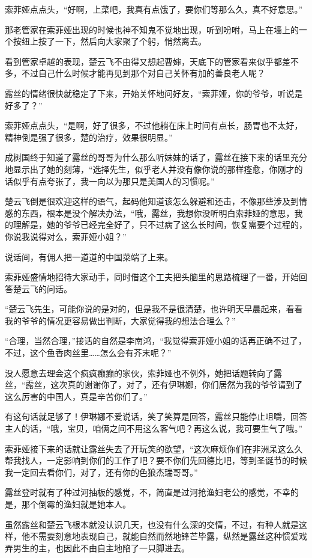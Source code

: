 索菲娅点点头，“好啊，上菜吧，我真有点饿了，要你们等那么久，真不好意思。”

那老管家在索菲娅出现的时候也神不知鬼不觉地出现，听到吩咐，马上在墙上的一个按纽上按了一下，然后向大家聚了个躬，悄然离去。

看到管家卓越的表现，楚云飞不由得又想起曹婶，天底下的管家看来似乎都差不多，不过自己什么时候才能再见到那个对自己关怀有加的善良老人呢？

露丝的情绪很快就稳定了下来，开始关怀地问好友，“索菲娅，你的爷爷，听说是好多了？”

索菲娅点点头，“是啊，好了很多，不过他躺在床上时间有点长，肠胃也不太好，精神倒是强了很多，楚的治疗，效果很明显。”

成树国终于知道了露丝的哥哥为什么那么听妹妹的话了，露丝在接下来的话里充分地显示出了她的刻薄，“选择先生，似乎老人并没有像你说的那样痊愈，你刚才的话似乎有点夸张了，我一向以为那只是美国人的习惯呢。”

楚云飞倒是很欢迎这样的语气，起码他知道该怎么躲避和还击，不像那些涉及到情感的东西，根本是没个解决办法，“哦，露丝，我想你没听明白索菲娅的意思，我的理解是，她的爷爷已经完全好了，只不过病了这么长时间，恢复需要个过程的，你说我说得对么，索菲娅小姐？”

说话间，有佣人把一道道的中国菜端了上来。

索菲娅盛情地招待大家动手，同时借这个工夫把头脑里的思路梳理了一番，开始回答楚云飞的问话。

“楚云飞先生，可能你说的是对的，但是我不是很清楚，也许明天早晨起来，看看我的爷爷的情况更容易做出判断，大家觉得我的想法合理么？”

“合理，当然合理，”接话的自然是李南鸿，“我觉得索菲娅小姐的话再正确不过了，不过，这个鱼香肉丝里……怎么会有芥末呢？”

没人愿意去理会这个疯疯癫癫的家伙，索菲娅也不例外，她把话题转向了露丝，“露丝，这次真的谢谢你了，对了，还有伊琳娜，你们居然为我的爷爷请到了这么厉害的中国人，真是辛苦你们了。”

有这句话就足够了！伊琳娜不爱说话，笑了笑算是回答，露丝只能停止咀嚼，回答主人的话，“哦，宝贝，咱俩之间不用这么客气吧？再这么说，我可要生气了哦。”

索菲娅接下来的话就让露丝失去了开玩笑的欲望，“这次麻烦你们在非洲呆这么久帮我找人，一定影响到你们的工作了吧？要不你们先回德比吧，等到圣诞节的时候我一定回去看你们，对了，还有你的色狼杰瑞哥哥。”

露丝登时就有了种过河抽板的感觉，不，简直是过河抢渔妇老公的感觉，不幸的是，那个倒霉的渔妇就是她本人。

虽然露丝和楚云飞根本就没认识几天，也没有什么深的交情，不过，有种人就是这样，他不需要刻意地表现自己，就能自然而然地锋芒毕露，纵然是露丝这种惯爱戏弄男生的主，也因此不由自主地陷了一只脚进去。

